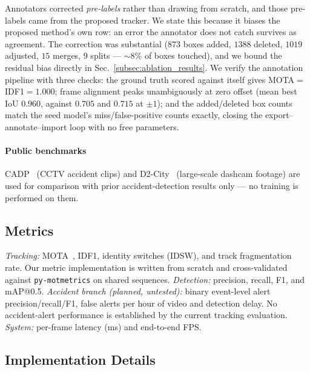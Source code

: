 Annotators corrected \emph{pre-labels} rather than drawing from scratch,
and those pre-labels came from the proposed tracker.
We state this because it biases the proposed method's own row: an error
the annotator does not catch survives as agreement.
The correction was substantial ($873$ boxes added, $1388$ deleted,
$1019$ adjusted, $15$ merges, $9$ splits --- $\sim$8\% of boxes
touched), and we bound the residual bias directly in
Sec.~\ref{subsec:ablation_results}.
We verify the annotation pipeline with three checks: the ground truth
scored against itself gives MOTA${=}$IDF1${=}1.000$; frame alignment
peaks unambiguously at zero offset (mean best IoU $0.960$, against
$0.705$ and $0.715$ at $\pm1$); and the added/deleted box counts match
the seed model's miss/false-positive counts exactly, closing the
export--annotate--import loop with no free parameters.

\paragraph{Public benchmarks}
CADP~\cite{Shah2018_cadp} (CCTV accident clips) and
D2-City~\cite{Che2019_d2city} (large-scale dashcam footage) are used
for comparison with prior accident-detection results only --- no
training is performed on them.

\subsection{Metrics}
\label{subsec:metrics}

\emph{Tracking:} MOTA~\cite{Bernardin2008_mota}, IDF1, identity
switches (IDSW), and track fragmentation rate.
Our metric implementation is written from scratch and cross-validated
against \texttt{py-motmetrics} on shared sequences.
\emph{Detection:} precision, recall, F1, and mAP@0.5.
\emph{Accident branch (planned, untested):} binary event-level alert
precision/recall/F1, false alerts per hour of video and detection delay.
No accident-alert performance is established by the current tracking evaluation.
\emph{System:} per-frame latency (ms) and end-to-end FPS.

\subsection{Implementation Details}
\label{subsec:impl}

